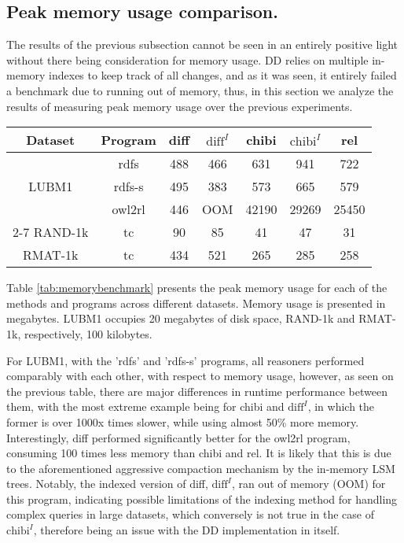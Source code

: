 \documentclass[sigconf,screen,review=false,natbib]{acmart}
\theoremstyle{definition}
\begin{document}
\subsection{Peak memory usage comparison.}
The results of the previous subsection cannot be seen in an entirely positive light without there being consideration for memory usage. DD relies on multiple
in-memory indexes to keep track of all changes, and as it was seen, it entirely failed a benchmark due to running out of memory, thus, in this section we analyze the results of
measuring peak memory usage over the previous experiments.
\begin{table*}
	\caption{Memory usage experimental results}
	\begin{center}
		\begin{tabular}{|c|c|c|c|c|c|c|}
			\hline
			Dataset                & Program & diff & $\text{diff}^{I}$ & chibi & $\text{chibi}^{I}$ & rel   \\
			\hline
			\multirow{3}{*}{LUBM1} & rdfs    & 488  & 466               & 631   & 941                & 722   \\
			                       & rdfs-s  & 495  & 383               & 573   & 665                & 579   \\
			                       & owl2rl  & 446  & OOM               & 42190 & 29269              & 25450 \\
			\cline{2-7}
			\hline
			RAND-1k                & tc      & 90   & 85                & 41    & 47                 & 31    \\
			\hline
			RMAT-1k                & tc      & 434  & 521               & 265   & 285                & 258   \\
			\hline
		\end{tabular}
	\end{center}
	\label{tab:memorybenchmark}
\end{table*}
Table \ref{tab:memorybenchmark} presents the peak memory usage for each of the methods and programs across different datasets. Memory usage is presented in megabytes. LUBM1
occupies 20 megabytes of disk space, RAND-1k and RMAT-1k, respectively, 100 kilobytes.

For LUBM1, with the 'rdfs' and 'rdfs-s' programs, all reasoners performed comparably with each other, with respect to memory usage, however, as seen on the previous table,
there are major differences in runtime performance between them, with the most extreme example being for chibi and $\text{diff}^{I}$, in which the former is over 1000x times
slower, while using almost 50\% more memory. Interestingly, diff performed significantly better for the owl2rl program, consuming 100 times less memory than chibi and rel. It
is likely that this is due to the aforementioned aggressive compaction mechanism by the in-memory LSM trees. Notably, the indexed version of diff, $\text{diff}^{I}$, ran out of
memory (OOM) for this program, indicating possible limitations of the indexing method for handling complex queries in large datasets, which conversely is not true in the case
of $\text{chibi}^{I}$, therefore being an issue with the DD implementation in itself.
\end{document}
